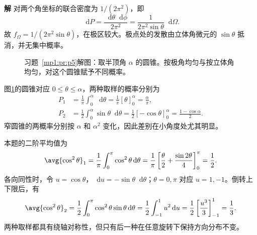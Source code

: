 \documentclass[11pt,openany,fontset=fandol]{ctexbook}
\theoremstyle{definition}\newtheorem{example}{例}[chapter]\newtheorem{exercise}{习题}[chapter]
\newcommand{\SolutionStart}{\par\medskip\ifdim\pagetotal>0pt\ifdim\dimexpr\pagegoal-\pagetotal\relax<3\baselineskip\newpage\fi\fi\noindent\textbf{解}\quad\ignorespaces}
\newenvironment{solution}{\SolutionStart}{\par\medskip}
\newcommand{\dd}{\mathop{}\!\mathrm d}\newcommand{\ee}{\mathrm e}\newcommand{\vct}[1]{\bm{#1}}
\begin{document}
\begin{solution}
对两个角坐标的联合密度为 $1/(2\pi^2)$，即
\[
\dd P=\frac{\dd\theta\dd\phi}{2\pi^2}
=\frac1{2\pi^2\sin\theta}\dd\Omega.
\]
故 $f_\Omega=1/(2\pi^2\sin\theta)$，在极区较大。极点处的发散由立体角微元的 $\sin\theta$ 抵消，并无集中概率。

\begin{figure}[H]\centering

\caption{习题~\ref{mp1:pr:p5}解图：取半顶角 $\alpha$ 的圆锥。按极角均匀与按立体角均匀，对这个圆锥赋予不同概率。}\label{mp1:fig:p5-s}
\end{figure}

图\ref{mp1:fig:p5-s}的圆锥对应 $0\le\theta\le\alpha$，两种取样的概率分别为
\[
\begin{aligned}
P_1&=\frac1\pi\int_0^\alpha\dd\theta
=\frac1\pi[\theta]_0^\alpha=\frac\alpha\pi,\\
P_2&=\frac12\int_0^\alpha\sin\theta\dd\theta
=\frac12[-\cos\theta]_0^\alpha=\frac{1-\cos\alpha}{2}.
\end{aligned}
\]
窄圆锥的两概率分别按 $\alpha$ 和 $\alpha^2$ 变化，因此差别在小角度处尤其明显。

本题的二阶平均值为
\[
\avg{\cos^2\theta}_1=\frac1\pi\int_0^\pi\cos^2\theta\dd\theta
=\frac1\pi\left[\frac\theta2+\frac{\sin2\theta}{4}\right]_0^\pi=\frac12.
\]
各向同性时，令 $u=\cos\theta$，$\dd u=-\sin\theta\dd\theta$；$\theta=0,\pi$ 对应 $u=1,-1$。倒转上下限后，有
\[
\avg{\cos^2\theta}_2=\frac12\int_0^\pi\cos^2\theta\sin\theta\dd\theta
=\frac12\int_{-1}^1u^2\dd u
=\frac12\left[\frac{u^3}{3}\right]_{-1}^1=\frac13.
\]
两种取样都具有绕轴对称性，但只有后一种在任意旋转下保持方向分布不变。
\end{solution}
\end{document}
